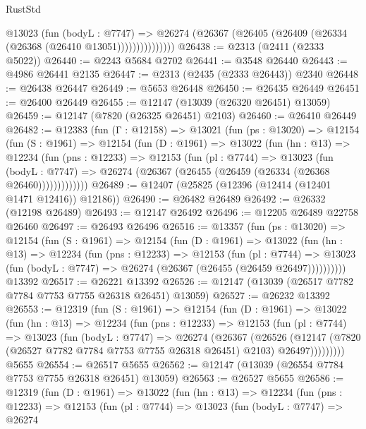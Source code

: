\begin{lexlean}{RustStd}
\begin{coremodule}
                  @13023
                    (fun (bodyL : @7747) =>
                    @26274 (@26367 (@26405 (@26409 (@26334 (@26368 (@26410 @13051)))))))))))))))
@26438 := @2313 (@2411 (@2333 @5022))
@26440 := @2243 @5684 @2702
@26441 := @3548 @26440
@26443 := @4986 @26441 @2135
@26447 := @2313 (@2435 (@2333 @26443)) @2340
@26448 := @26438 @26447
@26449 := @5653 @26448
@26450 := @26435 @26449
@26451 := @26400 @26449
@26455 := @12147 (@13039 (@26320 @26451) @13059)
@26459 := @12147 (@7820 (@26325 @26451) @2103)
@26460 := @26410 @26449
@26482 := @12383
    (fun (Γ : @12158) =>
    @13021
      (fun (ps : @13020) =>
      @12154
        (fun (S : @1961) =>
        @12154
          (fun (D : @1961) =>
          @13022
            (fun (hn : @13) =>
            @12234
              (fun (pns : @12233) =>
              @12153
                (fun (pl : @7744) =>
                @13023
                  (fun (bodyL : @7747) =>
                  @26274 (@26367 (@26455 (@26459 (@26334 (@26368 @26460)))))))))))))
@26489 := @12407 (@25825 (@12396 (@12414 (@12401 @1471 @12416)) @12186))
@26490 := @26482 @26489
@26492 := @26332 (@12198 @26489)
@26493 := @12147 @26492
@26496 := @12205 @26489 @22758 @26460
@26497 := @26493 @26496
@26516 := @13357
    (fun (ps : @13020) =>
    @12154
      (fun (S : @1961) =>
      @12154
        (fun (D : @1961) =>
        @13022
          (fun (hn : @13) =>
          @12234
            (fun (pns : @12233) =>
            @12153
              (fun (pl : @7744) =>
              @13023 (fun (bodyL : @7747) => @26274 (@26367 (@26455 (@26459 @26497))))))))))
    @13392
@26517 := @26221 @13392
@26526 := @12147 (@13039 (@26517 @7782 @7784 @7753 @7755 @26318 @26451) @13059)
@26527 := @26232 @13392
@26553 := @12319
    (fun (S : @1961) =>
    @12154
      (fun (D : @1961) =>
      @13022
        (fun (hn : @13) =>
        @12234
          (fun (pns : @12233) =>
          @12153
            (fun (pl : @7744) =>
            @13023
              (fun (bodyL : @7747) =>
              @26274
                (@26367
                  (@26526
                    (@12147
                      (@7820 (@26527 @7782 @7784 @7753 @7755 @26318 @26451) @2103)
                      @26497)))))))))
    @5655
@26554 := @26517 @5655
@26562 := @12147 (@13039 (@26554 @7784 @7753 @7755 @26318 @26451) @13059)
@26563 := @26527 @5655
@26586 := @12319
    (fun (D : @1961) =>
    @13022
      (fun (hn : @13) =>
      @12234
        (fun (pns : @12233) =>
        @12153
          (fun (pl : @7744) =>
          @13023
            (fun (bodyL : @7747) =>
            @26274

\end{coremodule}
\end{lexlean}
